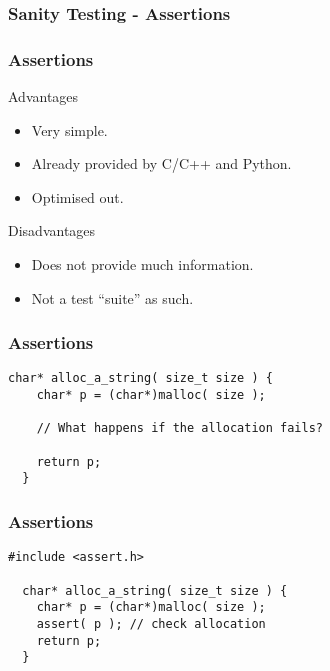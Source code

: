 \begin{frame}
  \frametitle{Sanity Testing - Assertions}
\end{frame}

\begin{frame}
  \frametitle{Assertions}
  \begin{block}{Advantages}
    \begin{itemize}
    \item Very simple.
    \item Already provided by C/C++ and Python.
    \item Optimised out.
    \end{itemize}
  \end{block}
  \begin{block}{Disadvantages}
    \begin{itemize}
    \item Does not provide much information.
    \item Not a test ``suite'' as such.
    \end{itemize}
  \end{block}
\end{frame}

\begin{frame}[fragile]
  \frametitle{Assertions}
  \begin{example}
    \begin{lstlisting}[style=C]
  char* alloc_a_string( size_t size ) {
    char* p = (char*)malloc( size );

    // What happens if the allocation fails?

    return p;
  }
    \end{lstlisting}
  \end{example}
\end{frame}

\begin{frame}[fragile]
  \frametitle{Assertions}
  \begin{example}
    \begin{lstlisting}[style=C]
  #include <assert.h>

  char* alloc_a_string( size_t size ) {
    char* p = (char*)malloc( size );
    assert( p ); // check allocation
    return p;
  }
    \end{lstlisting}
  \end{example}
  \vspace{1cm}
\end{frame}

